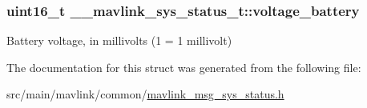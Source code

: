\hypertarget{struct____mavlink__sys__status__t_a47f55c2ec3aeb48c924092e2a46ffc99}{
\subsubsection[{voltage\+\_\+battery}]{\setlength{\rightskip}{0pt plus 5cm}uint16\+\_\+t \+\_\+\+\_\+mavlink\+\_\+sys\+\_\+status\+\_\+t\+::voltage\+\_\+battery}}\label{struct____mavlink__sys__status__t_a47f55c2ec3aeb48c924092e2a46ffc99}


Battery voltage, in millivolts (1 = 1 millivolt) 



The documentation for this struct was generated from the following file\+:\begin{DoxyCompactItemize}
\item 
src/main/mavlink/common/\hyperlink{mavlink__msg__sys__status_8h}{mavlink\+\_\+msg\+\_\+sys\+\_\+status.\+h}\end{DoxyCompactItemize}

